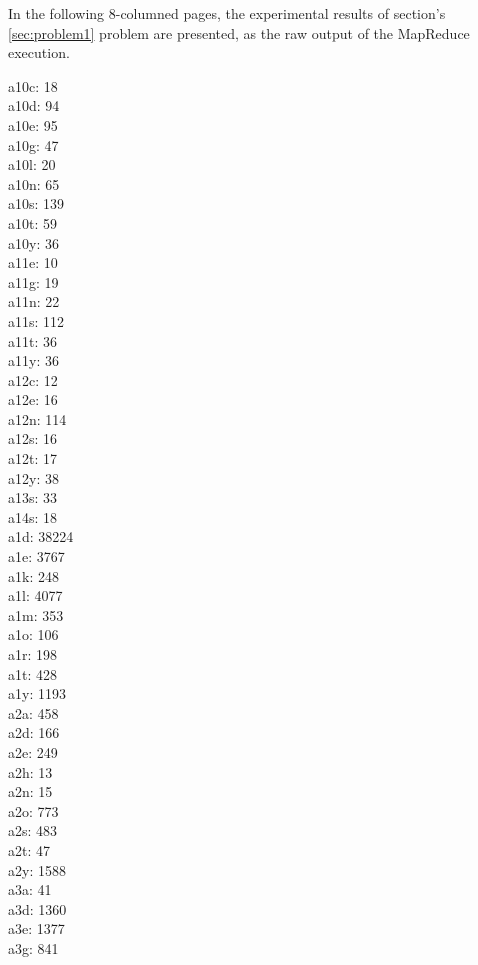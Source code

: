 In the following 8-columned pages, the experimental results of section's  \ref{sec:problem1} problem are presented,
as the raw output of the MapReduce execution.

\begin{multicols}{8}
  \noindent
  a10c: 18
  \\a10d: 94
  \\a10e: 95
  \\a10g: 47
  \\a10l: 20
  \\a10n: 65
  \\a10s: 139
  \\a10t: 59
  \\a10y: 36
  \\a11e: 10
  \\a11g: 19
  \\a11n: 22
  \\a11s: 112
  \\a11t: 36
  \\a11y: 36
  \\a12c: 12
  \\a12e: 16
  \\a12n: 114
  \\a12s: 16
  \\a12t: 17
  \\a12y: 38
  \\a13s: 33
  \\a14s: 18
  \\a1d: 38224
  \\a1e: 3767
  \\a1k: 248
  \\a1l: 4077
  \\a1m: 353
  \\a1o: 106
  \\a1r: 198
  \\a1t: 428
  \\a1y: 1193
  \\a2a: 458
  \\a2d: 166
  \\a2e: 249
  \\a2h: 13
  \\a2n: 15
  \\a2o: 773
  \\a2s: 483
  \\a2t: 47
  \\a2y: 1588
  \\a3a: 41
  \\a3d: 1360
  \\a3e: 1377
  \\a3g: 841

\end{multicols}
